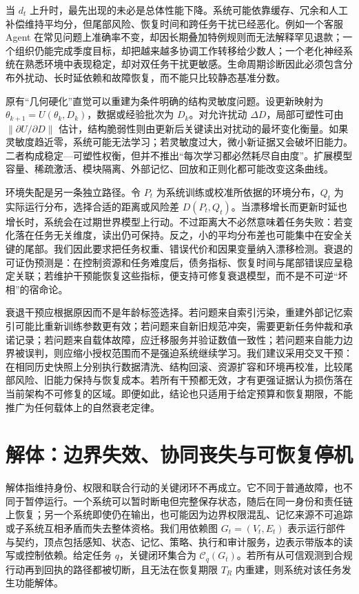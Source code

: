 当 $d_t$ 上升时，最先出现的未必是总体性能下降。系统可能依靠缓存、冗余和人工补偿维持平均分，但尾部风险、恢复时间和跨任务干扰已经恶化。例如一个客服 Agent 在常见问题上准确率不变，却因长期叠加特例规则而无法解释罕见退款；一个组织仍能完成季度目标，却把越来越多协调工作转移给少数人；一个老化神经系统在熟悉环境中表现稳定，却对双任务干扰更敏感。生命周期诊断因此必须包含分布外扰动、长时延依赖和故障恢复，而不能只比较静态基准分数。

原有“几何硬化”直觉可以重建为条件明确的结构灵敏度问题。设更新映射为 $\theta_{k+1}=U(\theta_k,D_k)$，数据或经验批次为 $D_k$。对允许扰动 $\Delta D$，局部可塑性可由 $\|\partial U/\partial D\|$ 估计，结构脆弱性则由更新后关键读出对扰动的最坏变化衡量。如果灵敏度趋近零，系统可能无法学习；若灵敏度过大，微小新证据又会破坏旧能力。二者构成稳定—可塑性权衡，但并不推出“每次学习都必然耗尽自由度”。扩展模型容量、稀疏激活、模块隔离、外部记忆、回放和正则化都可能改变这条曲线。

环境失配是另一条独立路径。令 $P_t$ 为系统训练或校准所依据的环境分布，$Q_t$ 为实际运行分布，选择合适的距离或风险差 $D(P_t,Q_t)$。当漂移增长而更新时延也增长时，系统会在过期世界模型上行动。不过距离大不必然意味着任务失败：若变化落在任务无关维度，读出仍可保持。反之，小的平均分布差也可能集中在安全关键的尾部。我们因此要求把任务权重、错误代价和因果变量纳入漂移检测。衰退的可证伪预测是：在控制资源和任务难度后，债务指标、恢复时间与尾部错误应呈稳定关联；若维护干预能恢复这些指标，便支持可修复衰退模型，而不是不可逆“坏相”的宿命论。

衰退干预应根据原因而不是年龄标签选择。若问题来自索引污染，重建外部记忆索引可能比重新训练参数更有效；若问题来自新旧规范冲突，需要更新任务仲裁和承诺记录；若问题来自载体故障，应迁移服务并验证数值一致性；若问题来自能力边界被误判，则应缩小授权范围而不是强迫系统继续学习。我们建议采用交叉干预：在相同历史快照上分别执行数据清洗、结构回滚、资源扩容和环境再校准，比较尾部风险、旧能力保持与恢复成本。若所有干预都无效，才有更强证据认为损伤落在当前架构不可修复的区域。即便如此，结论也只适用于给定预算和恢复期限，不能推广为任何载体上的自然衰老定律。

\section{解体：边界失效、协同丧失与可恢复停机}
\label{sec:emptiness}

解体指维持身份、权限和联合行动的关键闭环不再成立。它不同于普通故障，也不同于暂停运行。一个系统可以暂时断电但完整保存状态，随后在同一身份和责任链上恢复；另一个系统即使仍在输出，也可能因为边界权限混乱、记忆来源不可追踪或子系统互相矛盾而失去整体资格。我们用依赖图 $G_t=(V_t,E_t)$ 表示运行部件与契约，顶点包括感知、状态、记忆、策略、执行和审计服务，边表示带版本的读写或控制依赖。给定任务 $q$，关键闭环集合为 $\mathcal C_q(G_t)$。若所有从可信观测到合规行动再到回执的路径都被切断，且无法在恢复期限 $T_R$ 内重建，则系统对该任务发生功能解体。

